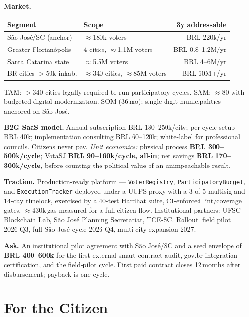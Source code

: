 \documentclass[12pt]{article}
\begin{document}
\noindent\textbf{Market.}
\begin{center}\small
\begin{tabular}{l l r}
\toprule
\textbf{Segment} & \textbf{Scope} & \textbf{3y addressable} \\
\midrule
S\~ao Jos\'e/SC (anchor) & \(\approx\)180k voters & BRL 220k/yr \\
Greater Florian\'opolis & 4 cities, \(\approx\)1.1M voters & BRL 0.8--1.2M/yr \\
Santa Catarina state & \(\approx\)5.5M voters & BRL 4--6M/yr \\
BR cities \(>\)50k inhab. & \(\approx\)340 cities, \(\approx\)85M voters & BRL 60M+/yr \\
\bottomrule
\end{tabular}
\end{center}

\noindent TAM: \(>\)340 cities legally required to run participatory
cycles. SAM: \(\approx\)80 with budgeted digital
modernization. SOM (36\,mo): single-digit municipalities anchored on
S\~ao Jos\'e.

\noindent\textbf{B2G SaaS model.} Annual subscription BRL 180--250k/city;
per-cycle setup BRL 40k; implementation consulting BRL 60--120k; white-label
for professional councils. Citizens never pay. \emph{Unit economics:}
physical process \textbf{BRL 300--500k/cycle}; VotaSJ \textbf{BRL
90--160k/cycle, all-in}; net savings \textbf{BRL 170--300k/cycle}, before
counting the political value of an unimpeachable result.

\noindent\textbf{Traction.} Production-ready platform ---
\texttt{VoterRegistry}, \texttt{ParticipatoryBudget}, and
\texttt{ExecutionTracker} deployed under a UUPS proxy with a 3-of-5
multisig and 14-day timelock, exercised by a 40-test Hardhat suite,
CI-enforced lint/coverage gates, \(\approx\)430k\,gas measured for a full
citizen flow. Institutional partners: UFSC Blockchain Lab, S\~ao Jos\'e
Planning Secretariat, TCE-SC. Rollout: field pilot 2026-Q3, full S\~ao
Jos\'e cycle 2026-Q4, multi-city expansion 2027.

\noindent\textbf{Ask.} An institutional pilot agreement with S\~ao Jos\'e/SC
and a seed envelope of \textbf{BRL 400--600k} for the first external
smart-contract audit, gov.br integration certification, and the field-pilot
cycle. First paid contract closes 12\,months after disbursement; payback is
one cycle.

\section*{For the Citizen}\label{sec:citizen}
\end{document}
